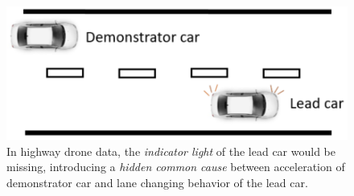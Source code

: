 \documentclass[letterpaper]{article} %
\theoremstyle{definition}%
\theoremstyle{definition}
\newcommand{\todo}[1]{\textcolor{red}{#1}}
\begin{document}
%
%

\begin{figure}[t]
	\centering
	\includegraphics[scale=.6]{example12.png}
	\caption{In highway drone data, the \emph{indicator light} of the lead car would be missing, introducing a \emph{hidden common cause} between acceleration of demonstrator car and lane changing behavior of the lead car. }\label{fig:example1}
\end{figure}
\end{document}
